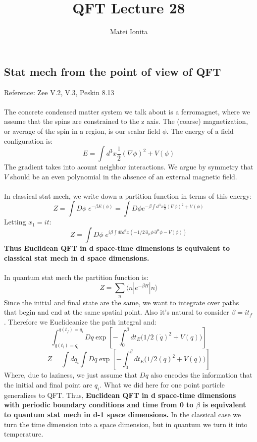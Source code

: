 \documentclass[12 pt]{article}
\title{QFT Lecture 28}
\author{Matei Ionita}
\DeclareMathOperator {\p} {\partial}
\begin{document}
  \maketitle


\subsection*{Stat mech from the point of view of QFT}
Reference: Zee V.2, V.3, Peskin 8.13
\\
\\
The concrete condensed matter system we talk about is a ferromagnet, where we assume that the spins are constrained to the z axis. The (coarse) magnetization, or average of the spin in a region, is our scalar field $\phi$. The energy of a field configuration is:
\[     E = \int d^3 x \frac{1}{2} (\nabla \phi)^2 + V(\phi)      \]
The gradient takes into acount neighbor interactions. We argue by symmetry that $V$ should be an even polynomial in the absence of an external magnetic field.
\\
\\
In classical stat mech, we write down a partition function in terms of this energy:
\[      Z = \int D\phi\;  e^{-\beta E(\phi)} = \int D\phi e^{-\beta \int d^3 x \frac{1}{2} (\nabla \phi)^2 + V(\phi)}   \]
Letting $x_1 = it$:
\[      Z = \int D\phi\;  e^{i\beta \int dt d^2x \left( - 1/2 \p_{\mu} \phi \p^{\mu} \phi - V(\phi)  \right) }    \]
\textbf{Thus Euclidean QFT in d space-time dimensions is equivalent to classical stat mech in d space dimensions.}
\\
\\
In quantum stat mech the partition function is:
\[      Z = \sum_n \langle n| e^{-\beta \hat H} |n\rangle    \]
Since the initial and final state are the same, we want to integrate over paths that begin and end at the same spatial point. Also it's natural to consider $\beta = it_f$. Therefore we Euclideanize the path integral and:
\[      \int_{q(t_i) = q_i}^{q(t_f) = q_i} Dq \exp \left[- \int_0^{\beta} dt_E \big(  1/2 (\dot q)^2 + V(q)  \big)    \right]       \]
\[     Z = \int d q_i      \int Dq \exp \left[- \int_0^{\beta} dt_E \big(  1/2 (\dot q)^2 + V(q)  \big)    \right]     \]
Where, due to laziness, we just assume that $Dq$ also encodes the information that the initial and final point are $q_i$. What we did here for one point particle generalizes to QFT. Thus, \textbf{Euclidean QFT in d space-time dimensions with periodic boundary conditions and time from 0 to $\beta$ is equivalent to quantum stat mech in d-1 space dimensions.} In the classical case we turn the time dimension into a space dimension, but in quantum we turn it into temperature.
\end{document}
